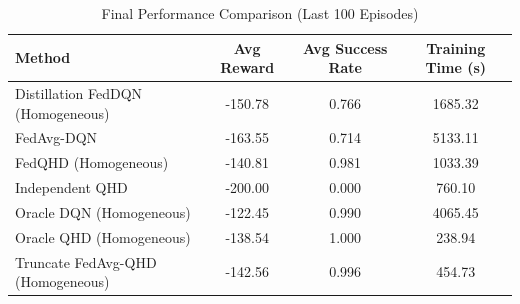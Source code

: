 \begin{table}[t]
\centering
\caption{Final Performance Comparison (Last 100 Episodes)}
\label{tab:performance_summary}
\begin{tabular}{lccc}
\toprule
Method & Avg Reward & Avg Success Rate & Training Time (s) \\
\midrule
Distillation FedDQN (Homogeneous) & -150.78 & 0.766 & 1685.32 \\
FedAvg-DQN & -163.55 & 0.714 & 5133.11 \\
FedQHD (Homogeneous) & -140.81 & 0.981 & 1033.39 \\
Independent QHD & -200.00 & 0.000 & 760.10 \\
Oracle DQN (Homogeneous) & -122.45 & 0.990 & 4065.45 \\
Oracle QHD (Homogeneous) & -138.54 & 1.000 & 238.94 \\
Truncate FedAvg-QHD (Homogeneous) & -142.56 & 0.996 & 454.73 \\
\bottomrule
\end{tabular}
\end{table}
